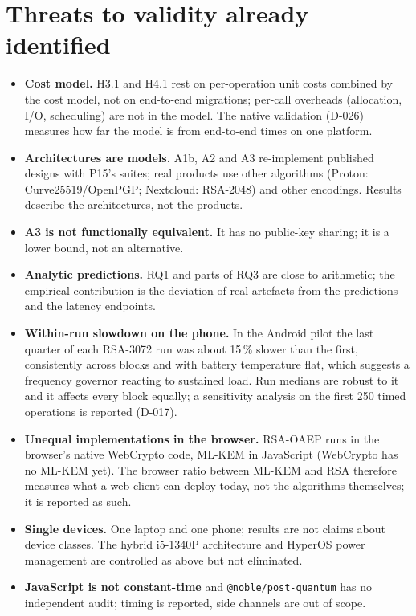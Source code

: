 \documentclass[11pt,a4paper]{article}
\begin{document}
\section{Threats to validity already identified}\label{sec:threats}
\begin{itemize}
\item \textbf{Cost model.} H3.1 and H4.1 rest on per-operation unit costs combined by the cost model, not on end-to-end migrations; per-call overheads (allocation, I/O, scheduling) are not in the model. The native validation (D-026) measures how far the model is from end-to-end times on one platform.
\item \textbf{Architectures are models.} A1b, A2 and A3 re-implement published designs with P15's suites; real products use other algorithms (Proton: Curve25519/OpenPGP; Nextcloud: RSA-2048) and other encodings. Results describe the architectures, not the products.
\item \textbf{A3 is not functionally equivalent.} It has no public-key sharing; it is a lower bound, not an alternative.
\item \textbf{Analytic predictions.} RQ1 and parts of RQ3 are close to arithmetic; the empirical contribution is the deviation of real artefacts from the predictions and the latency endpoints.
\item \textbf{Within-run slowdown on the phone.} In the Android pilot the last quarter of each RSA-3072 run was about 15\,\% slower than the first, consistently across blocks and with battery temperature flat, which suggests a frequency governor reacting to sustained load. Run medians are robust to it and it affects every block equally; a sensitivity analysis on the first 250 timed operations is reported (D-017).
\item \textbf{Unequal implementations in the browser.} RSA-OAEP runs in the browser's native WebCrypto code, ML-KEM in JavaScript (WebCrypto has no ML-KEM yet). The browser ratio between ML-KEM and RSA therefore measures what a web client can deploy today, not the algorithms themselves; it is reported as such.
\item \textbf{Single devices.} One laptop and one phone; results are not claims about device classes. The hybrid i5-1340P architecture and HyperOS power management are controlled as above but not eliminated.
\item \textbf{JavaScript is not constant-time} and \texttt{@noble/\allowbreak{}post-quantum} has no independent audit; timing is reported, side channels are out of scope.

\end{itemize}
\end{document}
